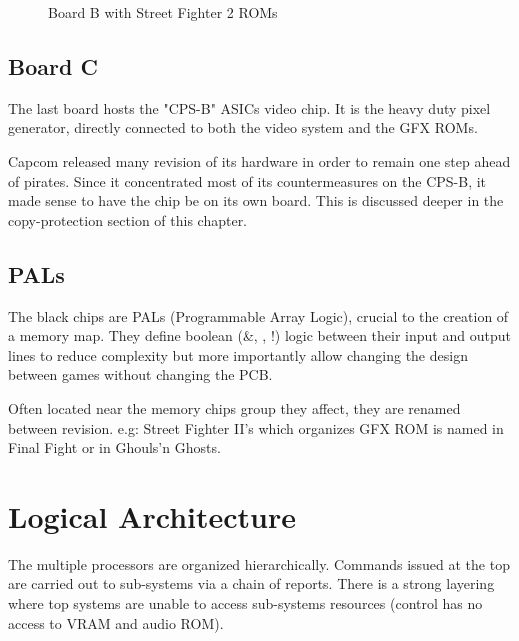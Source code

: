 \vfill
\begin{figure}[H]
  \caption*{Board B with Street Fighter 2 ROMs}
  \end{figure}







\subsection{Board C}
The last board hosts the "CPS-B" ASICs video chip. It is the heavy duty pixel generator, directly connected to both the video system and the GFX ROMs.

Capcom released many revision of its hardware in order to remain one step ahead of pirates. Since it concentrated most of its countermeasures on the CPS-B, it made sense to have the chip be on its own board. This is discussed deeper in the copy-protection section of this chapter.

\begin{minipage}[t]{0.49\linewidth}
\end{minipage}%
\hfill%
\begin{minipage}[t]{0.49\linewidth}
\end{minipage}

\subsection{PALs}
The black chips are PALs (Programmable Array Logic), crucial to the creation of a memory map. They define boolean (\&, \textbar, !) logic between their input and output lines to reduce complexity but more importantly allow changing the design between games without changing the PCB.


 Often located near the memory chips group they affect, they are renamed between revision. e.g: Street Fighter II's  which organizes GFX ROM is named  in Final Fight or  in Ghouls'n Ghosts.



\section{Logical Architecture}
The multiple processors are organized hierarchically. Commands issued at the top are carried out to sub-systems via a chain of reports. There is a strong layering where top systems are unable to access sub-systems resources (control has no access to VRAM and audio ROM).

